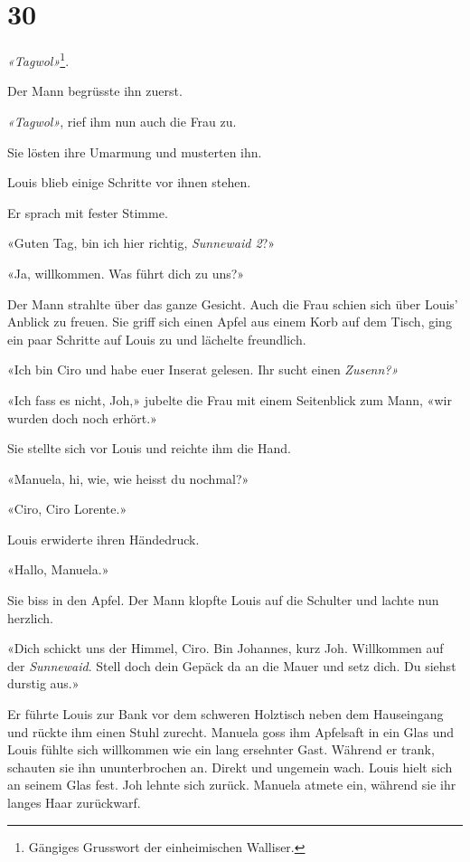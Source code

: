 \chapter{30}


\emph{«Tagwol»}\footnote{Gängiges Grusswort der einheimischen Walliser.}.

Der Mann begrüsste ihn zuerst.

\emph{«Tagwol»}, rief ihm nun auch die Frau zu.

Sie lösten ihre Umarmung und musterten ihn.

Louis blieb einige Schritte vor ihnen stehen.

Er sprach mit fester Stimme.

«Guten Tag, bin ich hier richtig, \emph{Sunnewaid 2}?»

«Ja, willkommen. Was führt dich zu uns?»

Der Mann strahlte über das ganze Gesicht. Auch die Frau schien sich über
Louis’ Anblick zu freuen. Sie griff sich einen Apfel aus einem Korb auf dem Tisch, ging ein paar Schritte auf Louis zu und lächelte
freundlich.

«Ich bin Ciro und habe euer Inserat gelesen. Ihr sucht einen
\emph{Zusenn?»}

«Ich fass es nicht, Joh,» jubelte die Frau mit einem Seitenblick zum
Mann, «wir wurden doch noch erhört.»

Sie stellte sich vor Louis und reichte ihm die Hand.

«Manuela, hi, wie, wie heisst du nochmal?»

«Ciro, Ciro Lorente.»

Louis erwiderte ihren Händedruck.

«Hallo, Manuela.»

Sie biss in den Apfel. Der Mann klopfte Louis auf die Schulter und lachte nun herzlich.

«Dich schickt uns der Himmel, Ciro. Bin Johannes, kurz Joh. Willkommen
auf der \emph{Sunnewaid}. Stell doch dein Gepäck da an die Mauer und setz dich. Du siehst durstig aus.»

Er führte Louis zur Bank vor dem schweren Holztisch neben dem
Hauseingang und rückte ihm einen Stuhl zurecht.
Manuela goss ihm Apfelsaft in ein Glas und Louis fühlte sich willkommen wie ein lang ersehnter Gast. Während er trank, schauten sie ihn
ununterbrochen an. Direkt und ungemein wach. Louis hielt sich an seinem
Glas fest. Joh lehnte sich zurück. Manuela atmete ein, während sie ihr
langes Haar zurückwarf.


